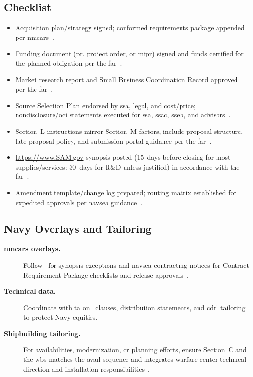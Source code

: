 \documentclass[../main.tex]{subfiles}
\begin{document}
\subsection{Checklist}
\begin{itemize}
  \item Acquisition plan/strategy signed; conformed requirements package appended per \ac{nmcars}~\autocite{NMCARS}.
  \item Funding document (\ac{pr}, project order, or \ac{mipr}) signed and funds certified for the planned obligation per the \ac{far}~\autocite{FAR}.
  \item Market research report and Small Business Coordination Record approved per the \ac{far}~\autocite{FAR}.
  \item Source Selection Plan endorsed by \ac{ssa}, legal, and cost/price; nondisclosure/\ac{oci} statements executed for \ac{ssa}, \ac{ssac}, \ac{sseb}, and advisors~\autocite{NAVSEA-Source-Selection-Guide-2022}.
  \item Section~L instructions mirror Section~M factors, include proposal structure, late proposal policy, and submission portal guidance per the \ac{far}~\autocite{FAR}.
  \item \url{https://www.SAM.gov} synopsis posted (15~days before closing for most supplies/services; 30~days for R\&D unless justified) in accordance with the \ac{far}~\autocite{FAR}.
  \item Amendment template/change log prepared; routing matrix established for expedited approvals per \ac{navsea} guidance~\autocite{NAVSEA-Contracts-Handbook-2023}.
\end{itemize}

\subsection{Navy Overlays and Tailoring}
\begin{description}
  \item[\textbf{\ac{nmcars} overlays.}] Follow~\autocite[\S~5205.303/5205.301]{NMCARS} for synopsis exceptions and \ac{navsea} contracting notices for Contract Requirement Package checklists and release approvals~\autocite{NMCARS,NAVSEA-Contracts-Handbook-2023}.
  \item[\textbf{Technical data.}] Coordinate with \ac{ta} on~\autocite[\S~252.227]{DFARS} clauses, distribution statements, and \ac{cdrl} tailoring to protect Navy equities.
  \item[\textbf{Shipbuilding tailoring.}] For availabilities, modernization, or planning efforts, ensure Section~C and the \ac{wbs} matches the avail sequence and integrates warfare-center technical direction and installation responsibilities~\autocite{edo-3-2-2-solicitation-prep-2025}.
\end{description}
\end{document}
